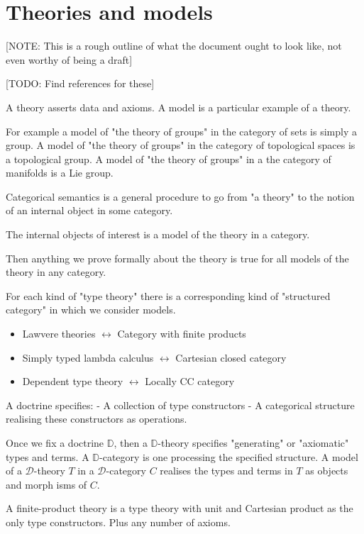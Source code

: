 \section{Theories and models}

[NOTE: This is a rough outline of what the document ought to look like, not even worthy of being a draft]

[TODO: Find references for these]
\begin{defin}
    A theory asserts data and axioms.
    A model is a particular example of a theory.
\end{defin}

For example a model of "the theory of groups" in the category of sets is simply a group. A model of "the theory of groups" in the category of topological spaces is a topological group. A model of "the theory of groups" in a the category of manifolds is a Lie group.

Categorical semantics is a general procedure to go from "a theory" to the notion of an internal object in some category.

The internal objects of interest is a model of the theory in a category.

Then anything we prove formally about the theory is true for all models of the theory in any category.

For each kind of "type theory" there is a corresponding kind of "structured category" in which we consider models.

\begin{itemize}
    \item Lawvere theories $\leftrightarrow$ Category with finite products
    \item Simply typed lambda calculus $\leftrightarrow$ Cartesian closed category
    \item Dependent type theory $\leftrightarrow$ Locally CC category
\end{itemize}

A doctrine specifies:
 - A collection of type constructors
 - A categorical structure realising these constructors as operations.

Once we fix a doctrine $\mathbb{D}$, then a $\mathbb{D}$-theory specifies "generating" or "axiomatic" types and terms.
A $\mathbb{D}$-category is one processing the specified structure.
A model of a $\mathcal{D}$-theory $T$ in a $\mathcal{D}$-category $C$ realises the types and terms in $T$ as objects and morph isms of $C$.

A finite-product theory is a type theory with unit and Cartesian product as the only type constructors. Plus any number of axioms.

